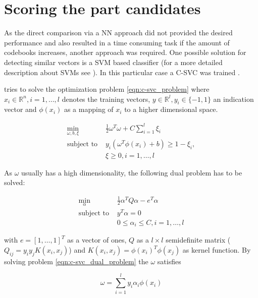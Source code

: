 \section{Scoring the part candidates}


As the direct comparison via a \ac{NN} approach did not provided the desired performance and also resulted in a time consuming task if the amount of codebooks increases, another approach was required. One possible solution for detecting similar vectors is a \ac{SVM} based classifier (for a more detailed description about \acp{SVM} see ). In this particular case a \ac{C-SVC} was trained \cite{Chang:2011:LLS:1961189.1961199} \cite{boser1992training} \cite{cortes1995support}.

 tries to solve the optimization problem \ref{eqn:c-svc_problem} where $x_i \in \mathbb{R}^n, i = 1, \dots, l$ denotes the training vectors, $y \in \mathbb{R}^l, y_i \in \{-1, 1\}$ an indication vector and $\phi(x_i)$ as a mapping of $x_i$ to a higher dimensional space.

\begin{align}
\min_{\omega, b, \xi} &\frac{1}{2} \omega^T \omega + C \sum_{i=1}^{l} \xi_i 
    \label{eqn:c-svc_problem} \\
\text{subject to } &y_i(\omega^T \phi(x_i) + b) \ge 1 - \xi_i, \nonumber \\
                   &\xi \ge 0, i = 1, \dots, l \nonumber
\end{align}

As $\omega$ usually has a high dimensionality, the following dual problem has to be solved:

\begin{align}
\min_\alpha & \frac{1}{2} \alpha^T Q \alpha - e^T \alpha 
    \label{eqn:c-svc_dual_problem} \\
\text{subject to } & y^T \alpha = 0 \nonumber \\
                   & 0 \le \alpha_i \le C, i = 1, \dots, l \nonumber
\end{align}

with $e = [1, \dots, 1]^T$ as a vector of ones, $Q$ as a $l \times l$ semidefinite matrix ($Q_{ij} = y_i y_j K(x_i, x_j)$) and $K(x_i, x_j) = \phi(x_i)^T \phi(x_j)$ as kernel function.
By solving problem \ref{eqn:c-svc_dual_problem} the $\omega$ satisfies 

\begin{equation}
\omega = \sum_{i=1}^{l} y_i \alpha_i \phi(x_i)
\end{equation}

